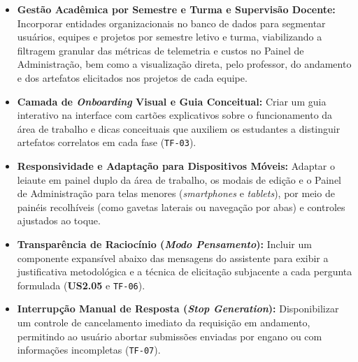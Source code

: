 \begin{itemize}
    \item \textbf{Gestão Acadêmica por Semestre e Turma e Supervisão Docente:} Incorporar entidades organizacionais no banco de dados para segmentar usuários, equipes e projetos por semestre letivo e turma, viabilizando a filtragem granular das métricas de telemetria e custos no Painel de Administração, bem como a visualização direta, pelo professor, do andamento e dos artefatos elicitados nos projetos de cada equipe.
    \item \textbf{Camada de \textit{Onboarding} Visual e Guia Conceitual:} Criar um guia interativo na interface com cartões explicativos sobre o funcionamento da área de trabalho e dicas conceituais que auxiliem os estudantes a distinguir artefatos correlatos em cada fase (\texttt{TF-03}).
    \item \textbf{Responsividade e Adaptação para Dispositivos Móveis:} Adaptar o leiaute em painel duplo da área de trabalho, os modais de edição e o Painel de Administração para telas menores (\textit{smartphones} e \textit{tablets}), por meio de painéis recolhíveis (como gavetas laterais ou navegação por abas) e controles ajustados ao toque.
    \item \textbf{Transparência de Raciocínio (\textit{Modo Pensamento}):} Incluir um componente expansível abaixo das mensagens do assistente para exibir a justificativa metodológica e a técnica de elicitação subjacente a cada pergunta formulada (\textbf{US2.05} e \texttt{TF-06}).
    \item \textbf{Interrupção Manual de Resposta (\textit{Stop Generation}):} Disponibilizar um controle de cancelamento imediato da requisição em andamento, permitindo ao usuário abortar submissões enviadas por engano ou com informações incompletas (\texttt{TF-07}).
\end{itemize}
